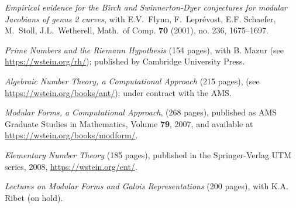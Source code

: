 \documentclass[10pt]{article}
\newcommand{\ptitle}{\em}
\newcounter{totalnumpapers}
\newcounter{totalnumbooks}
\newenvironment{papers}
   {
   \begin{revnumerate}[\value{totalnumpapers}]
   {}
         {
            \setlength{\itemsep}{.5ex}
            \setlength{\parsep}{0ex}
            \setlength{\leftmargin}{0em}
            \setlength{\parskip}{0ex}
            \setlength{\topsep}{0ex}
         }
   }
   {
\end{revnumerate}
   }
\newenvironment{books}
   {
   \begin{revnumerate}[\value{totalnumbooks}]
   {}
         {
            \setlength{\itemsep}{.5ex}
            \setlength{\parsep}{0ex}
            \setlength{\leftmargin}{0em}
            \setlength{\parskip}{0ex}
            \setlength{\topsep}{0ex}
         }
   }
   {
\end{revnumerate}
   }
\newcommand{\marginlabel}[1]{
\begin{minipage}[b]{0.8\labelwidth}{\large \textsf{\textbf{#1}}}\end{minipage}}
\newcommand{\entrylabel}[1]{\mbox{\marginlabel{#1}}\hfill}
\newcommand{\MainListlabel}[1]
   {
      \parbox[t]{\labelwidth}{\hspace{.8em}\marginlabel{#1}}
   }
\newenvironment{MainList}[1]
   {
      \renewcommand{\entrylabel}{\MainListlabel}
      \begin{list}{}
      {
         \renewcommand{\makelabel}{\entrylabel}
         \setlength   {\itemindent}{-.65em}
         \setlength   {\labelwidth}{#1}
         \setlength   {\leftmargin}{\labelwidth}
         \setlength   {\itemsep}{3ex}
      }
   }
   {
      \end{list}
   }
\begin{document}
\begin{MainList}{88pt}
\begin{papers}
\item {\ptitle Empirical evidence for
     the Birch and Swinnerton-Dyer conjectures for modular Jacobians of
     genus 2 curves},
     with E.\thinspace{}V.~Flynn, F.~Lepr\'{e}vost,
     E.\thinspace{}F. Schaefer,
     M.~Stoll, J.\thinspace{}L.~Wetherell,
     Math.\  of Comp. {\bf 70} (2001), no. 236, 1675--1697.


 \end{papers}



\item [Books]
\begin{books}
\item {\ptitle Prime Numbers and the Riemann Hypothesis} (154 pages), with
  B. Mazur (see \url{https://wstein.org/rh/});
  published by
  Cambridge University Press.

\item {\ptitle Algebraic Number Theory, a Computational Approach} (215 pages), (see \url{https://wstein.org/books/ant/}); under contract with the AMS.

\item {\ptitle Modular Forms, a Computational Approach}, (268
pages), published as AMS Graduate Studies in Mathematics, Volume {\bf 79},  2007,
and  available at \url{https://wstein.org/books/modform/}.

  \item {\ptitle Elementary Number Theory}
   (185 pages), published in the Springer-Verlag UTM series, 2008,
\url{https://wstein.org/ent/}.


\item {\ptitle Lectures on Modular Forms and Galois Representations}
  (200 pages), with K.\thinspace{}A. Ribet (on hold).


\end{books}


\end{MainList}
\end{document}
